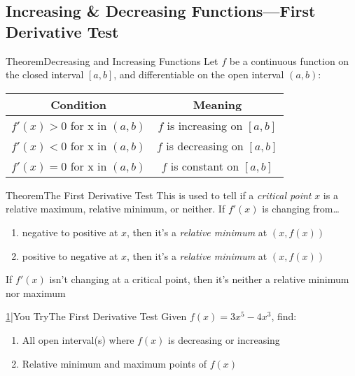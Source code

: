 \documentclass{MathNotes}
\newenvironment{theorem}[1]{\begin{GrayBox}{Theorem}{#1}}{\end{GrayBox}}
\newenvironment{practice}[2]{\begin{PurpleBox}{\texorpdfstring{#1}\Big|You Try}{#2}}{\end{PurpleBox}}
\begin{document}
\newpage
\subsection{Increasing \& Decreasing Functions---First Derivative Test}\label{sec:3.3}

\begin{theorem}{Decreasing and Increasing Functions}
	Let $f$ be a continuous function on the closed interval $[a, b]$, and
	differentiable on the open interval $(a, b)$:\newline
	\begin{center}
		\begin{tabular}{|c|c|}
			\hline
			Condition                   & Meaning                      \\
			\hline
			$f'(x)>0$ for x in $(a, b)$ & $f$ is increasing on $[a,b]$ \\
			$f'(x)<0$ for x in $(a, b)$ & $f$ is decreasing on $[a,b]$ \\
			$f'(x)=0$ for x in $(a, b)$ & $f$ is constant on $[a,b]$   \\
			\hline
		\end{tabular}
	\end{center}
\end{theorem}

\begin{theorem}{The First Derivative Test}
	This is used to tell if a \textit{critical point} $x$ is a relative
	maximum, relative minimum, or neither. If $f'(x)$ is changing from\ldots

	\begin{enumerate}
		\item negative to positive at $x$, then it's a
		      \textit{relative minimum} at $(x, f(x))$
		\item positive to negative at $x$, then it's a
		      \textit{relative minimum} at $(x, f(x))$
	\end{enumerate}
	If $f'(x)$ isn't changing at a critical point, then it's neither a
	relative minimum nor maximum
\end{theorem}
\begin{practice}{\hyperref[ans:3.3-1]{1}}{The First Derivative Test}
	\label{prac:3.3-1}
	Given $\displaystyle f(x)=3x^5-4x^3$, find:
	\begin{enumerate}
		\item All open interval(s) where $f(x)$ is decreasing or increasing
		\item Relative minimum and maximum points of $f(x)$
	\end{enumerate}
\end{practice}
\end{document}
